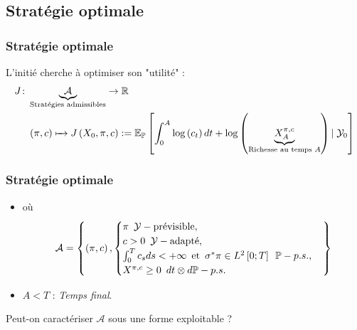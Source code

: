 \documentclass{beamer}
\begin{document}
\subsection{Stratégie optimale}
\begin{frame}
\frametitle{Stratégie optimale}
\par L'initié cherche à optimiser son "utilité" :
\small
\begin{align*}
      J \colon &\underbrace{\mathcal{A}}_{\text{Stratégies admissibles}} \to \mathbb{R} \\
       &\left( \pi, c \right) \xmapsto{\phantom{\mathcal{A}}} J \left( X_0, \pi, c \right) := \mathbb{E}_{\mathbb{P}} \left[ \int_0^A \log  \left( c_t \right) dt + \log \left( \underbrace{X_A^{\pi, c}}_{\text{Richesse au temps } A} \right) \left\vert\right. \mathcal{Y}_0 \right]
\end{align*}

\end{frame}

\begin{frame}
\frametitle{Stratégie optimale}

\begin{itemize}

\item où
\begin{displaymath}
\mathcal{A} = \left\lbrace \left( \pi, c \right), 
\begin{cases} 
\pi \enskip \mathcal{Y}-\text{prévisible}, \\
c > 0 \enskip \mathcal{Y}-\text{adapté}, \\ 
\int_0^T c_s ds < + \infty \enskip \text{et} \enskip \sigma^* \pi \in L^2 \left[ 0; T \right] \enskip \mathbb{P}-p.s., \\
X^{\pi, c} \geq 0 \enskip dt \otimes d \mathbb{P}-p.s. 
\end{cases}
\right\rbrace
\end{displaymath} 
\item $A < T$ : \emph{Temps final}.
\end{itemize}
\par Peut-on caractériser $\mathcal{A}$ sous une forme exploitable ?
\end{frame}
\end{document}

